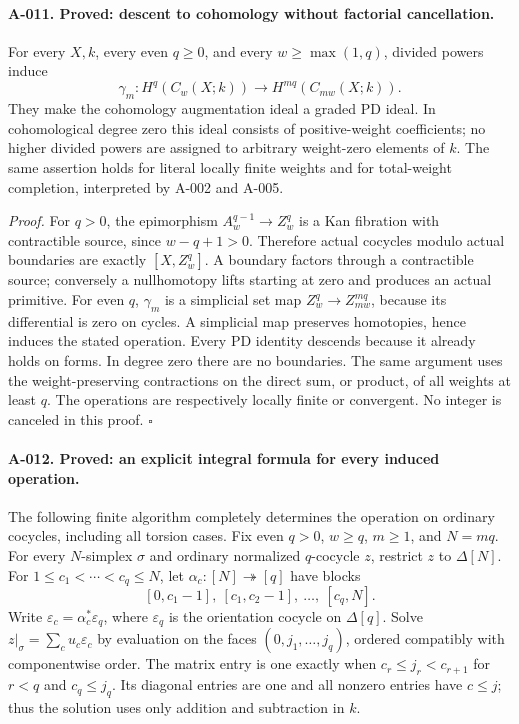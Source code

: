 \paragraph{A-011. Proved: descent to cohomology without factorial
cancellation.}
For every $X,k$, every even $q\geq0$, and every
$w\geq\max(1,q)$, divided powers induce
\[
 \gamma_m:H^q(C_w(X;k))\longrightarrow H^{mq}(C_{mw}(X;k)).
\]
They make the cohomology augmentation ideal a graded PD ideal. In
cohomological degree zero this ideal consists of positive-weight
coefficients; no higher divided powers are assigned to arbitrary
weight-zero elements of $k$.
The same assertion holds for literal locally finite weights and for
total-weight completion, interpreted by A-002 and A-005.

\emph{Proof.}
For $q>0$, the epimorphism $A_w^{q-1}\to Z_w^q$ is a Kan
fibration with contractible source, since $w-q+1>0$. Therefore
actual cocycles modulo actual boundaries are exactly $[X,Z_w^q]$.
A boundary factors through a contractible source; conversely a
nullhomotopy lifts starting at zero and produces an actual primitive.
For even $q$, $\gamma_m$ is a simplicial set map
$Z_w^q\to Z_{mw}^{mq}$, because its differential is zero on cycles.
A simplicial map preserves homotopies, hence induces the stated
operation. Every PD identity descends because it already holds on
forms. In degree zero there are no boundaries. The same argument
uses the weight-preserving contractions on the direct sum, or product,
of all weights at least $q$. The operations are respectively locally
finite or convergent. No integer is canceled in this proof.
\hfill$\square$

\paragraph{A-012. Proved: an explicit integral formula for every
induced operation.}
The following finite algorithm completely determines the operation
on ordinary cocycles, including all torsion cases. Fix even $q>0$,
$w\geq q$, $m\geq1$, and $N=mq$. For every $N$-simplex $\sigma$
and ordinary normalized $q$-cocycle $z$, restrict $z$ to $\Delta[N]$.
For $1\leq c_1<\cdots<c_q\leq N$, let
$\alpha_c:[N]\twoheadrightarrow[q]$ have blocks
\[
 [0,c_1-1],\ [c_1,c_2-1],\ \ldots,\ [c_q,N].
\]
Write $\varepsilon_c=\alpha_c^*\varepsilon_q$, where
$\varepsilon_q$ is the orientation cocycle on $\Delta[q]$.
Solve $z|_\sigma=\sum_c u_c\varepsilon_c$ by evaluation on the
faces $(0,j_1,\ldots,j_q)$, ordered compatibly with componentwise
order. The matrix entry is one exactly when
$c_r\leq j_r<c_{r+1}$ for $r<q$ and $c_q\leq j_q$.
Its diagonal entries are one and all nonzero entries have $c\leq j$;
thus the solution uses only addition and subtraction in $k$.

